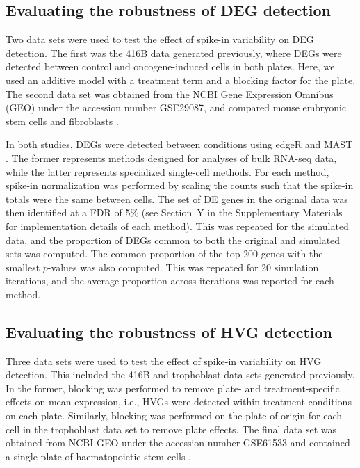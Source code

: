 \documentclass{article}
\begin{document}
\subsection{Evaluating the robustness of DEG detection}
Two data sets were used to test the effect of spike-in variability on DEG detection.
The first was the 416B data generated previously, where DEGs were detected between control and oncogene-induced cells in both plates.
Here, we used an additive model with a treatment term and a blocking factor for the plate.
The second data set was obtained from the NCBI Gene Expression Omnibus (GEO) under the accession number GSE29087, and compared mouse embryonic stem cells and fibroblasts \cite{islam2011characterization}.

In both studies, DEGs were detected between conditions using edgeR \cite{robinson2010edgeR} and MAST \cite{finak2015mast}.
The former represents methods designed for analyses of bulk RNA-seq data, while the latter represents specialized single-cell methods.
For each method, spike-in normalization was performed by scaling the counts such that the spike-in totals were the same between cells.
The set of DE genes in the original data was then identified at a FDR of 5\% (see Section~Y in the Supplementary Materials for implementation details of each method).
This was repeated for the simulated data, and the proportion of DEGs common to both the original and simulated sets was computed.
The common proportion of the top 200 genes with the smallest $p$-values was also computed.
This was repeated for 20 simulation iterations, and the average proportion across iterations was reported for each method.

\subsection{Evaluating the robustness of HVG detection}
Three data sets were used to test the effect of spike-in variability on HVG detection.
This included the 416B and trophoblast data sets generated previously.
In the former, blocking was performed to remove plate- and treatment-specific effects on mean expression, i.e., HVGs were detected within treatment conditions on each plate.
Similarly, blocking was performed on the plate of origin for each cell in the trophoblast data set to remove plate effects.
The final data set was obtained from NCBI GEO under the accession number GSE61533 and contained a single plate of haematopoietic stem cells \cite{wilson2015combined}.
\end{document}
